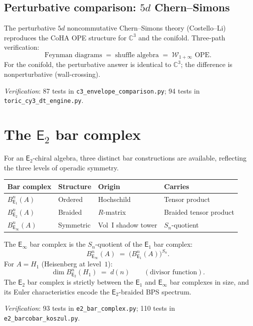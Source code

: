 \documentclass[11pt]{article}
\newcommand{\cW}{\mathcal{W}}
\newcommand{\C}{\mathbb{C}}
\newcommand{\Eone}{\mathsf{E}_1}
\newcommand{\Etwo}{\mathsf{E}_2}
\newcommand{\Einf}{\mathsf{E}_{\infty}}
\begin{document}
\subsection{Perturbative comparison: $5d$ Chern--Simons}
\label{subsec:5d-cs}

\begin{proposition}
\label{prop:5d-cs-coha}
The perturbative $5d$ noncommutative Chern--Simons theory (Costello--Li) reproduces the CoHA OPE structure for $\C^3$ and the conifold. Three-path verification:
\[
 \text{Feynman diagrams} \;=\; \text{shuffle algebra} \;=\; \cW_{1+\infty} \text{ OPE}.
\]
For the conifold, the perturbative answer is identical to $\C^3$; the difference is nonperturbative (wall-crossing).

\noindent\textit{Verification}: 87 tests in \texttt{c3\_envelope\_comparison.py}; 94 tests in \texttt{toric\_cy3\_dt\_engine.py}.
\end{proposition}


\section{The $\Etwo$ bar complex}
\label{wn:sec:e2-bar}

For an $\Etwo$-chiral algebra, three distinct bar constructions are available, reflecting the three levels of operadic symmetry.

\begin{theorem}
\label{thm:three-bar-complexes}
\begin{center}
\renewcommand{\arraystretch}{1.2}
\begin{tabular}{llll}
 \toprule
 \textbf{Bar complex} & \textbf{Structure} & \textbf{Origin} & \textbf{Carries} \\
 \midrule
 $B_{\Eone}^n(A)$ & Ordered & Hochschild & Tensor product \\
 $B_{\Etwo}^n(A)$ & Braided & $R$-matrix & Braided tensor product \\
 $B_{\Einf}^n(A)$ & Symmetric & Vol~I shadow tower & $S_n$-quotient \\
 \bottomrule
\end{tabular}
\end{center}
The $\Einf$ bar complex is the $S_n$-quotient of the $\Eone$ bar complex:
\[
 B_{\Einf}^n(A) \;=\; \bigl(B_{\Eone}^n(A)\bigr)^{S_n}.
\]
For $A = H_1$ (Heisenberg at level~$1$):
\[
 \dim B_{\Etwo}^n(H_1) \;=\; d(n) \qquad (\text{divisor function}).
\]
The $\Etwo$ bar complex is strictly between the $\Eone$ and $\Einf$ bar complexes in size, and its Euler characteristics encode the $\Etwo$-braided BPS spectrum.

\noindent\textit{Verification}: 93 tests in \texttt{e2\_bar\_complex.py}; 110 tests in \texttt{e2\_barcobar\_koszul.py}.
\end{theorem}
\end{document}
